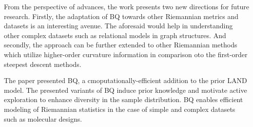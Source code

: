 \documentclass[12pt,letterpaper]{article}
\begin{document}
From the perspective of advances, the work presents two new directions for future research. Firstly, the adaptation of BQ towards other Riemannian metrics and datasets is an interesting avenue. The aforesaid would help in understanding other complex datasets such as relational models in graph structures. And secondly, the approach can be further extended to other Riemannian methods which utilize higher-order curvature information in comparison oto the first-order steepest descent methods. 

The paper presented BQ, a cmoputationally-efficient addition to the prior LAND model. The presented variants of BQ induce prior knowledge and motivate active exploration to enhance diversity in the sample distribution. BQ enables efficient modeling of Riemannian statistics in the case of simple and complex datasets such as molecular designs.
\end{document}
